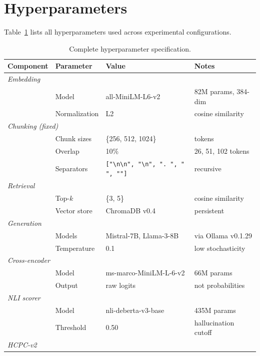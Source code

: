 \clearpage
\appendix

\section{Hyperparameters}
\label{app:hyperparams}

Table~\ref{tab:hyperparams} lists all hyperparameters used across
experimental configurations.

\begin{table}[!htb]
\centering
\caption{Complete hyperparameter specification.}
\label{tab:hyperparams}
\footnotesize
\begin{tabular}{llll}
\toprule
Component & Parameter & Value & Notes \\
\midrule
\multicolumn{4}{l}{\emph{Embedding}} \\
& Model & all-MiniLM-L6-v2 & 82M params, 384-dim \\
& Normalization & L2 & cosine similarity \\
\midrule
\multicolumn{4}{l}{\emph{Chunking (fixed)}} \\
& Chunk sizes & \{256, 512, 1024\} & tokens \\
& Overlap & 10\% & 26, 51, 102 tokens \\
& Separators & \texttt{["\textbackslash n\textbackslash n", "\textbackslash n", ". ", " ", ""]} & recursive \\
\midrule
\multicolumn{4}{l}{\emph{Retrieval}} \\
& Top-$k$ & \{3, 5\} & cosine similarity \\
& Vector store & ChromaDB v0.4 & persistent \\
\midrule
\multicolumn{4}{l}{\emph{Generation}} \\
& Models & Mistral-7B, Llama-3-8B & via Ollama v0.1.29 \\
& Temperature & 0.1 & low stochasticity \\
\midrule
\multicolumn{4}{l}{\emph{Cross-encoder}} \\
& Model & ms-marco-MiniLM-L-6-v2 & 66M params \\
& Output & raw logits & not probabilities \\
\midrule
\multicolumn{4}{l}{\emph{NLI scorer}} \\
& Model & nli-deberta-v3-base & 435M params \\
& Threshold & 0.50 & hallucination cutoff \\
\midrule
\multicolumn{4}{l}{\emph{HCPC-v2}} \\

\end{tabular}
\end{table}
